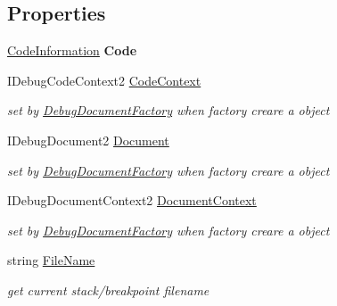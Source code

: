 \subsection*{Properties}
\begin{DoxyCompactItemize}
\item 
\hypertarget{classlib_wather_debugger_1_1_document_context_1_1_debug_document_a1f8b8d6c4376344a58a1ac9661020351}{\hyperlink{classlib_wather_debugger_1_1_document_context_1_1_code_information}{Code\+Information} {\bfseries Code}}\label{classlib_wather_debugger_1_1_document_context_1_1_debug_document_a1f8b8d6c4376344a58a1ac9661020351}

\item 
I\+Debug\+Code\+Context2 \hyperlink{classlib_wather_debugger_1_1_document_context_1_1_debug_document_ae0ef452be2b8d2172dc400609a334386}{Code\+Context}
\begin{DoxyCompactList}\small\item\em set by \hyperlink{classlib_wather_debugger_1_1_document_context_1_1_debug_document_factory}{Debug\+Document\+Factory} when factory creare a object \end{DoxyCompactList}\item 
I\+Debug\+Document2 \hyperlink{classlib_wather_debugger_1_1_document_context_1_1_debug_document_a060cec73f6364f7c4206c4f557c64a18}{Document}
\begin{DoxyCompactList}\small\item\em set by \hyperlink{classlib_wather_debugger_1_1_document_context_1_1_debug_document_factory}{Debug\+Document\+Factory} when factory creare a object \end{DoxyCompactList}\item 
I\+Debug\+Document\+Context2 \hyperlink{classlib_wather_debugger_1_1_document_context_1_1_debug_document_a93f0e326cd96b71ef0bc927bdea63049}{Document\+Context}
\begin{DoxyCompactList}\small\item\em set by \hyperlink{classlib_wather_debugger_1_1_document_context_1_1_debug_document_factory}{Debug\+Document\+Factory} when factory creare a object \end{DoxyCompactList}\item 
string \hyperlink{classlib_wather_debugger_1_1_document_context_1_1_debug_document_adff9995f07c21a4cdecca746742b5afe}{File\+Name}
\begin{DoxyCompactList}\small\item\em get current stack/breakpoint filename \end{DoxyCompactList}\end{DoxyCompactItemize}


